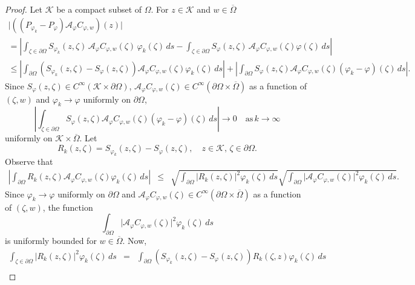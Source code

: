 \documentclass[11pt, reqno]{amsart}
\numberwithin{equation}{section}
\begin{document}
\begin{proof}
Let $\mathcal{K}$ be a compact subset of $\Omega$. For $z\in\mathcal{K}$ and $w\in\overline{\Omega}$
\begin{multline*}
\vert ((P_{\varphi_k}-P_{\varphi})\mathcal{A}_{\varphi} C_{\varphi,w})(z)\vert\\
=
\left\lvert
\int_{\zeta\in\partial\Omega} S_{\varphi_k}(z,\zeta)\,\mathcal{A}_{\varphi} C_{\varphi,w}(\zeta)\,\varphi_k(\zeta) \,ds
-
\int_{\zeta\in\partial\Omega} S_{\varphi}(z,\zeta)\,\mathcal{A}_{\varphi} C_{\varphi,w}(\zeta)\varphi(\zeta) \,ds 
\right\rvert
\\
\leq
\left\lvert
\int_{\partial\Omega} (S_{\varphi_k}(z,\zeta)-S_{\varphi}(z,\zeta))\mathcal{A}_{\varphi} C_{\varphi,w}(\zeta) \varphi_k(\zeta)\,ds
\right\rvert 
+
\left\lvert
\int_{\partial\Omega} S_{\varphi}(z,\zeta)\mathcal{A}_{\varphi} C_{\varphi,w}(\zeta) (\varphi_k-\varphi)(\zeta)\,ds
\right\rvert.
\end{multline*}
Since $S_{\varphi}(z,\zeta)\in C^{\infty}(\mathcal{K}\times \partial\Omega)$, $\mathcal{A}_{\varphi} C_{\varphi,w}(\zeta)\in C^{\infty}(\partial\Omega\times \overline{\Omega})$ as a function of $(\zeta,w)$ and $\varphi_k\rightarrow\varphi$ uniformly on $\partial\Omega$, 
\[
\left\lvert
\int_{\zeta\in\partial\Omega} S_{\varphi}(z,\zeta)\mathcal{A}_{\varphi} C_{\varphi,w}(\zeta) (\varphi_k-\varphi)(\zeta)\,ds
\right\rvert
\rightarrow 0
\quad \text{as}\,k\rightarrow\infty
\]
uniformly on $\mathcal{K}\times\overline{\Omega}$. Let 
\[
R_k(z,\zeta)
=
S_{\varphi_k}(z,\zeta)-S_{\varphi}(z,\zeta), 
\quad
z\in\mathcal{K},\, \zeta\in\partial\Omega.
\]
Observe that
\begin{eqnarray*}
\left\lvert
\int_{\partial\Omega} R_k(z,\zeta)\mathcal{A}_{\varphi} C_{\varphi,w}(\zeta) \varphi_k(\zeta)\,ds
\right\rvert
&\leq&
\sqrt{\int_{\partial\Omega} \vert R_k(z,\zeta)\vert^2 \varphi_k(\zeta)\,ds}
\sqrt{\int_{\partial\Omega} \vert \mathcal{A}_{\varphi} C_{\varphi,w}(\zeta)\vert^2 \varphi_k(\zeta)\,ds}.
\end{eqnarray*}
Since $\varphi_k\rightarrow\varphi$ uniformly on $\partial\Omega$ and $\mathcal{A}_{\varphi} C_{\varphi,w}(\zeta)\in C^{\infty}(\partial\Omega\times\overline{\Omega})$ as a function of $(\zeta,w)$, the function
\[
\int_{\partial\Omega} \vert \mathcal{A}_{\varphi} C_{\varphi,w}(\zeta)\vert^2 \varphi_k(\zeta)\,ds
\]
is uniformly bounded for $w\in\overline{\Omega}$. Now,
\begin{eqnarray*}
\int_{\zeta\in\partial\Omega} \vert R_k(z,\zeta)\vert^2 \varphi_k(\zeta)\,ds
&=&
\int_{\partial\Omega} (S_{\varphi_k}(z,\zeta)-S_{\varphi}(z,\zeta)) R_k(\zeta,z) \varphi_k(\zeta)\,ds\\

\end{eqnarray*}
\end{proof}
\end{document}
